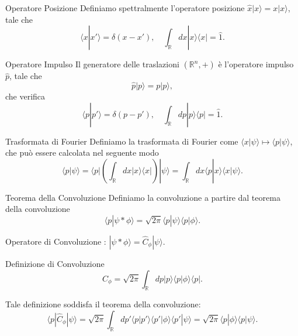 \documentclass[xcolor=dvipsnames]{beamer}
\newcommand{\R}{\mathbb{R}}
\begin{document}
\begin{frame}
    \begin{block}{Operatore Posizione}
        Definiamo spettralmente l'operatore posizione $\widehat{x}|x\rangle = x | x \rangle$, tale che
        \[ \langle x | x' \rangle = \delta(x-x'), \quad
    \int_{\R} dx | x \rangle \langle x | = \widehat{1} .\]
    \end{block}
    \begin{block}{Operatore Impulso}
    Il generatore delle traslazioni $(\R^n,+)$ è l'operatore impulso $\widehat{p}$, tale che
    \[ \widehat{p} | p \rangle = p | p \rangle, \]
    che verifica
    \[ \langle p | p' \rangle = \delta(p-p'), \quad
    \int_{\R} dp | p \rangle \langle p | = \widehat{1} .\]
    \end{block}
\end{frame}

\begin{frame}
    \begin{block}{Trasformata di Fourier}
        Definiamo la trasformata di Fourier come $\langle x | \psi \rangle \mapsto \langle p | \psi \rangle$, 
        che può essere calcolata nel seguente modo
        \[ \langle p | \psi \rangle = \langle p | \left( \int_{\R} dx | x \rangle \langle x| \right) | \psi \rangle = 
         \int_{\R} dx \langle p | x \rangle \langle x | \psi \rangle. \]
    \end{block}
    \begin{block}{Teorema della Convoluzione}
        Definiamo la convoluzione a partire dal teorema della convoluzione
        \[ \langle p | \psi * \phi \rangle = \sqrt{2\pi} \langle p | \psi \rangle \langle p | \phi \rangle . \]
    \end{block}
\end{frame}

\begin{frame}
    Operatore di Convoluzione : $ | \psi * \phi \rangle = \widehat{C}_\phi | \psi \rangle$.
    \begin{block}{Definizione di Convoluzione}
        \[ \widehat{C}_\phi = \sqrt{2\pi} \int_\R dp | p \rangle \langle p | \phi \rangle \langle p | . \]
    \end{block}
    Tale definizione soddisfa il teorema della convoluzione:
    \[ \langle p | \widehat{C}_\phi | \psi \rangle = \sqrt{2\pi} \int_\R dp' \langle p | p' \rangle \langle p' | \phi \rangle \langle p' | \psi \rangle  =
    \sqrt{2\pi} \langle p | \phi \rangle \langle p | \psi \rangle .  \]
\end{frame}
\end{document}
